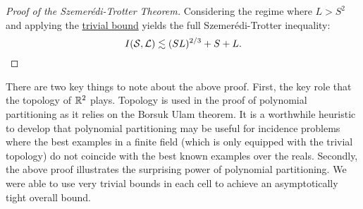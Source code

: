 \begin{proof}[Proof of the Szemerédi-Trotter Theorem]
Considering the regime where $L > S^2$ and applying the \hyperref[thm:trivial-ST-bounds]{trivial bound} yields the full Szemerédi-Trotter inequality:
\[
    I(\mathcal S, \mathcal L) \lesssim (SL)^{2/3} + S + L. 
\]
\end{proof}

There are two key things to note about the above proof. First, the key role that the topology of $\mathbb R^2$ plays. Topology is used in the proof of polynomial partitioning as
it relies on the Borsuk Ulam theorem. It is a worthwhile heuristic to develop that polynomial partitioning may be useful for incidence problems
where the best examples in a finite field (which is only equipped with the trivial topology) do not coincide with the best known examples over the reals.
Secondly, the above proof illustrates the surprising power of polynomial partitioning. We were able to use very trivial bounds in each cell to achieve
an asymptotically tight overall bound. 

